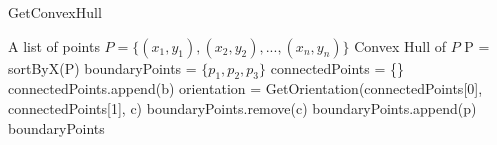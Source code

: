 \documentclass{article}
\begin{document}
    \begin{latin}
        \begin{algorithm}[H]
            \caption{GetConvexHull}
            \begin{algorithmic}
                \Require A list of points $P = \{(x_1, y_1), (x_2, y_2),..., (x_n, y_n)\}$
                \Ensure Convex Hull of $P$
                \State P = sortByX(P)
                \State boundaryPoints = $\{p_1, p_2, p_3\}$
                    \State connectedPoints = \{\}
                            \State connectedPoints.append(b)
                        \EndIf
                    \EndFor
                        \State orientation = GetOrientation(connectedPoints[0], connectedPoints[1], c)
                            \State boundaryPoints.remove(c)
                        \EndIf
                    \EndFor
                    \State boundaryPoints.append(p)
                \EndFor
                \State \Return boundaryPoints
            \end{algorithmic}
        \end{algorithm}
    \end{latin}
\end{document}
